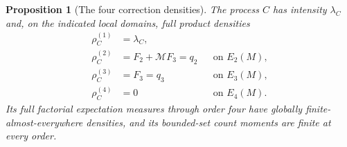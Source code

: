 \documentclass[11pt,a4paper]{article}
\numberwithin{equation}{section}
\newtheorem{proposition}[theorem]{Proposition}
\theoremstyle{definition}
\theoremstyle{remark}
\newcommand{\Mop}{\mathcal M}
\begin{document}
\begin{proposition}[The four correction densities]\label{prop:C-densities}
The process $C$ has intensity $\lambda_C$ and, on the indicated local
domains, full product densities
\begin{align}
 \rho_C^{(1)}&=\lambda_C,\label{eq:C1}\\
 \rho_C^{(2)}&=F_2+\Mop F_3=q_2
                      &&\text{on }E_2(M),\label{eq:C2}\\
 \rho_C^{(3)}&=F_3=q_3
                      &&\text{on }E_3(M),\label{eq:C3}\\
 \rho_C^{(4)}&=0
                      &&\text{on }E_4(M).\label{eq:C4}
\end{align}
Its full factorial expectation measures through order four have globally
finite-almost-everywhere densities, and its bounded-set count moments are
finite at every order.
\end{proposition}
\end{document}
